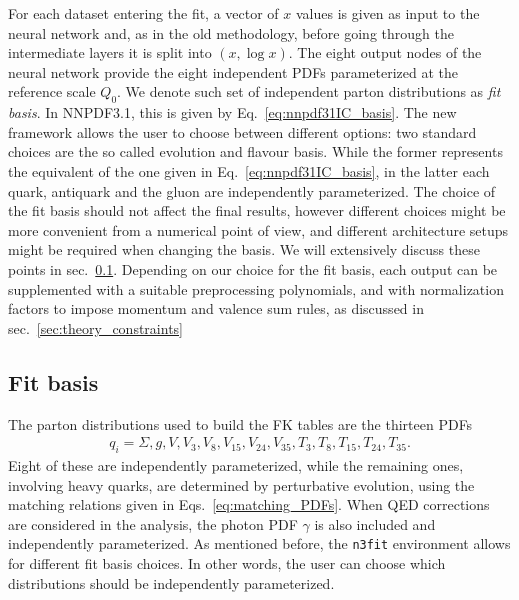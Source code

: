 %
For each dataset entering the fit, a vector of $x$ values is given as input to the neural network and,
as in the old methodology, before going through the intermediate layers it is split into $\left(x,\log x\right)$.
The eight output nodes of the neural network provide the eight independent PDFs parameterized at 
the reference scale $Q_0$. We denote such set of independent parton distributions as \textit{fit basis}.
In NNPDF3.1, this is given by Eq.~\eqref{eq:nnpdf31IC_basis}. The new framework allows the user to choose between 
different options: two standard choices are the so called evolution and flavour basis.
While the former represents the equivalent of the one given in Eq.~\eqref{eq:nnpdf31IC_basis}, in
the latter each quark, antiquark and the gluon are independently parameterized. 
The choice of the fit basis should not affect the final results, however different choices might be more
convenient from a numerical point of view, and different architecture setups might be required
when changing the basis. We will extensively discuss these points in sec.~\ref{sec:fitbasis}.
Depending on our choice for the fit basis, each output can be supplemented with a suitable preprocessing
polynomials, and with normalization factors to impose momentum and valence sum rules,
as discussed in sec.~\ref{sec:theory_constraints}

\subsection{Fit basis}
\label{sec:fitbasis}
The parton distributions used to build the FK tables are the thirteen PDFs
\begin{align}
	\label{eq::fkdistributions}
	q_i = \Sigma, g, V, V_3, V_8, V_{15}, V_{24}, V_{35}, T_3, T_8, T_{15}, T_{24}, T_{35}.
\end{align}
Eight of these are independently parameterized, while the remaining ones, involving heavy quarks,
are determined by perturbative evolution, using the matching relations given in Eqs.~\eqref{eq:matching_PDFs}.
When QED corrections are considered in the analysis,
the photon PDF $\gamma$ is also included and independently parameterized.   
As mentioned before, the {\tt n3fit} environment allows for different fit basis choices. In other 
words, the user can choose which distributions should be independently parameterized. 

